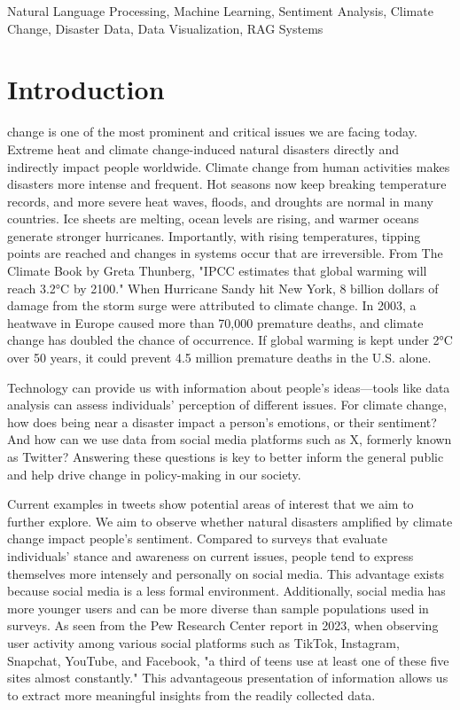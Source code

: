 \documentclass{ieeeaccess}
\begin{document}
\begin{keywords}
Natural Language Processing, Machine Learning, Sentiment Analysis, Climate Change, Disaster Data, Data Visualization, RAG Systems
\end{keywords}

\titlepgskip=-21pt

\maketitle

\section{Introduction}
\label{sec:introduction}
 change is one of the most prominent and critical issues we are facing today. Extreme heat and climate change-induced natural disasters directly and indirectly impact people worldwide. Climate change from human activities makes disasters more intense and frequent. Hot seasons now keep breaking temperature records, and more severe heat waves, floods, and droughts are normal in many countries. Ice sheets are melting, ocean levels are rising, and warmer oceans generate stronger hurricanes. Importantly, with rising temperatures, tipping points are reached and changes in systems occur that are irreversible. From The Climate Book by Greta Thunberg, "IPCC estimates that global warming will reach 3.2°C by 2100." When Hurricane Sandy hit New York, 8 billion dollars of damage from the storm surge were attributed to climate change. In 2003, a heatwave in Europe caused more than 70,000 premature deaths, and climate change has doubled the chance of occurrence. If global warming is kept under 2°C over 50 years, it could prevent 4.5 million premature deaths in the U.S. alone.

Technology can provide us with information about people's ideas—tools like data analysis can assess individuals' perception of different issues. For climate change, how does being near a disaster impact a person's emotions, or their sentiment? And how can we use data from social media platforms such as X, formerly known as Twitter? Answering these questions is key to better inform the general public and help drive change in policy-making in our society. 

Current examples in tweets show potential areas of interest that we aim to further explore. We aim to observe whether natural disasters amplified by climate change impact people's sentiment. Compared to surveys that evaluate individuals' stance and awareness on current issues, people tend to express themselves more intensely and personally on social media. This advantage exists because social media is a less formal environment. Additionally, social media has more younger users and can be more diverse than sample populations used in surveys. As seen from the Pew Research Center report in 2023, when observing user activity among various social platforms such as TikTok, Instagram, Snapchat, YouTube, and Facebook, "a third of teens use at least one of these five sites almost constantly." This advantageous presentation of information allows us to extract more meaningful insights from the readily collected data.
\end{document}
